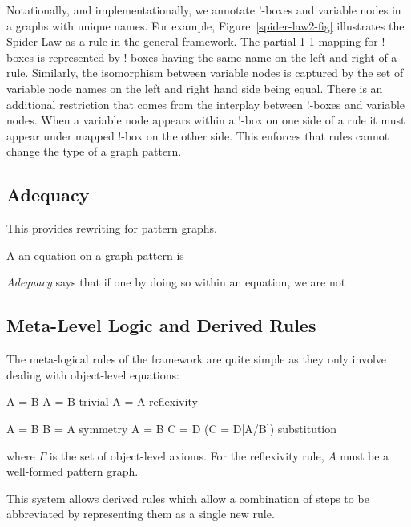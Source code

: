 \documentclass[runningheads]{llncs}
\begin{document}
Notationally, and implementationally, we annotate !-boxes and variable
nodes in a graphs with unique names. For example,
Figure~\ref{spider-law2-fig} illustrates the Spider Law as a rule in
the general framework. The partial 1-1 mapping for !-boxes is
represented by !-boxes having the same name on the left and right of a
rule. Similarly, the isomorphism between variable nodes is captured by
the set of variable node names on the left and right hand side being
equal. There is an additional restriction that comes from the
interplay between !-boxes and variable nodes. When a variable node
appears within a !-box on one side of a rule it must appear under
mapped !-box on the other side. This enforces that rules cannot change
the type of a graph pattern.

\subsection{Adequacy}

This
provides rewriting for pattern graphs.

A an equation on a graph pattern is 

\emph{Adequacy} says that if one by doing so within an
equation, we are not


\subsection{Meta-Level Logic and Derived Rules}

The meta-logical rules of the framework are quite simple as they only
involve dealing with object-level equations:

\begin{center}
\prooftree
A = B \in \Gamma
\justifies
\Gamma \vdash A = B
\using\mbox{trivial}
\endprooftree
\quad\quad
\prooftree
\justifies
\Gamma \vdash A = A
\using\mbox{reflexivity}
\endprooftree
\end{center}

\begin{center}
\prooftree
\Gamma \vdash A = B
\justifies
\Gamma \vdash B = A
\using\mbox{symmetry}
\endprooftree
\quad\quad
\prooftree
\Gamma \vdash A = B
\Gamma \vdash C = D
\justifies
\Gamma \vdash (C = D[A/B])
\using\mbox{substitution}
\endprooftree
\end{center}

\noindent where $\Gamma$ is the set of object-level axioms. For the
reflexivity rule, $A$ must be a well-formed pattern graph. 

This system allows derived rules which allow a combination of steps to
be abbreviated by representing them as a single new rule. 
\end{document}
